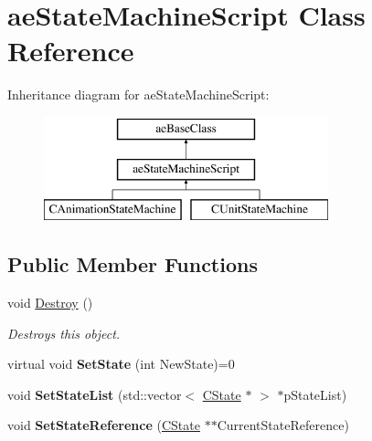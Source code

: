 \hypertarget{classae_state_machine_script}{}\section{ae\+State\+Machine\+Script Class Reference}
\label{classae_state_machine_script}
Inheritance diagram for ae\+State\+Machine\+Script\+:\begin{figure}[H]
\begin{center}
\leavevmode
\includegraphics[height=3.000000cm]{classae_state_machine_script}
\end{center}
\end{figure}
\subsection*{Public Member Functions}
\begin{DoxyCompactItemize}
\item 
void \hyperlink{classae_state_machine_script_a6942f6b0d8ddad638e324a9fb0f9bf18}{Destroy} ()\hypertarget{classae_state_machine_script_a6942f6b0d8ddad638e324a9fb0f9bf18}{}\label{classae_state_machine_script_a6942f6b0d8ddad638e324a9fb0f9bf18}

\begin{DoxyCompactList}\small\item\em Destroys this object. \end{DoxyCompactList}\item 
virtual void {\bfseries Set\+State} (int New\+State)=0\hypertarget{classae_state_machine_script_a3b23cbf9c1fd223aedc3a749e364fd67}{}\label{classae_state_machine_script_a3b23cbf9c1fd223aedc3a749e364fd67}

\item 
void {\bfseries Set\+State\+List} (std\+::vector$<$ \hyperlink{class_c_state}{C\+State} $\ast$ $>$ $\ast$p\+State\+List)\hypertarget{classae_state_machine_script_a9a486fa08e377069d5deac8e7b0958b5}{}\label{classae_state_machine_script_a9a486fa08e377069d5deac8e7b0958b5}

\item 
void {\bfseries Set\+State\+Reference} (\hyperlink{class_c_state}{C\+State} $\ast$$\ast$Current\+State\+Reference)\hypertarget{classae_state_machine_script_ade3da83335b88ffbd673365d2b80055e}{}\label{classae_state_machine_script_ade3da83335b88ffbd673365d2b80055e}

\end{DoxyCompactItemize}
